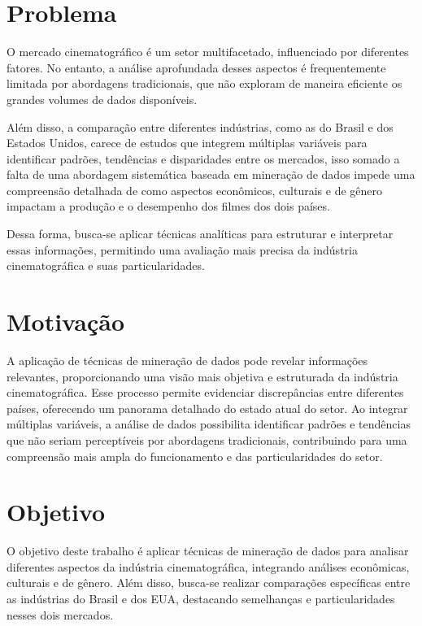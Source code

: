 


\section{Problema}%
O mercado cinematográfico é um setor multifacetado, influenciado por diferentes fatores. No entanto, a análise aprofundada desses aspectos é frequentemente limitada por abordagens tradicionais, que não exploram de maneira eficiente os grandes volumes de dados disponíveis. 

Além disso, a comparação entre diferentes indústrias, como as do Brasil e dos Estados Unidos, carece de estudos que integrem múltiplas variáveis para identificar padrões, tendências e disparidades entre os mercados, isso somado a falta de uma abordagem sistemática baseada em mineração de dados impede uma compreensão detalhada de como aspectos econômicos, culturais e de gênero impactam a produção e o desempenho dos filmes dos dois países.

Dessa forma, busca-se aplicar técnicas analíticas para estruturar e interpretar essas informações, permitindo uma avaliação mais precisa da indústria cinematográfica e suas particularidades.

\section{Motivação}
A aplicação de técnicas de mineração de dados pode revelar informações relevantes, proporcionando uma visão mais objetiva e estruturada da indústria cinematográfica. Esse processo permite evidenciar discrepâncias entre diferentes países, oferecendo um panorama detalhado do estado atual do setor. Ao integrar múltiplas variáveis, a análise de dados possibilita identificar padrões e tendências que não seriam perceptíveis por abordagens tradicionais, contribuindo para uma compreensão mais ampla do funcionamento e das particularidades do setor.

\section{Objetivo}
O objetivo deste trabalho é aplicar técnicas de mineração de dados para analisar diferentes aspectos da indústria cinematográfica, integrando análises econômicas, culturais e de gênero. Além disso, busca-se realizar comparações específicas entre as indústrias do Brasil e dos EUA, destacando semelhanças e particularidades nesses dois mercados.

